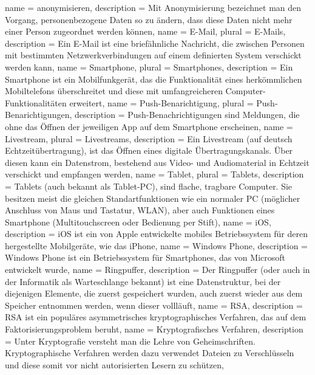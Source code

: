 {
  name = anonymisieren,
  description = {Mit Anonymisierung bezeichnet man den Vorgang, personenbezogene Daten so zu ändern, dass diese Daten nicht mehr einer Person zugeordnet werden können},
}
{
  name = E-Mail,
  plural = E-Mails,
  description = {Ein E-Mail ist eine briefähnliche Nachricht, die zwischen Personen mit bestimmten Netzwerkverbindungen auf einem definierten System verschickt werden kann},
}
{
  name = Smartphone,
  plural = Smartphones,
  description = {Ein Smartphone ist ein Mobilfunkgerät, das die Funktionalität eines herkömmlichen Mobiltelefons überschreitet und diese mit umfangreicheren Computer-Funktionalitäten erweitert},
}
{
  name = Push-Benarichtigung,
  plural = Push-Benarichtigungen,
  description = {Push-Benachrichtigungen sind Meldungen, die ohne das Öffnen der jeweiligen \gls{App} auf dem \gls{Smartphone} erscheinen},
}
{
  name = Livestream,
  plural = Livestreams,
  description = {Ein Livestream (auf deutsch Echtzeitübertragung), ist das Öffnen eines digitale Übertragungskanals. Über diesen kann ein Datenstrom, bestehend aus Video- und Audiomaterial in Echtzeit verschickt und empfangen werden},
}
{
  name = Tablet,
  plural = Tablets,
  description = {Tablets (auch bekannt als Tablet-PC), sind flache, tragbare Computer. Sie besitzen meist die gleichen Standartfunktionen wie ein normaler PC (möglicher Anschluss von Maus und Tastatur, WLAN), aber auch Funktionen eines \gls{Smartphone} (Multitouchscreen oder Bedienung per Stift)},
}
{
  name = iOS,
  description = {iOS ist ein von Apple entwickelte mobiles Betriebssystem für deren hergestellte Mobilgeräte, wie das iPhone},
}
{
  name = Windows Phone,
  description = {Windows Phone ist ein Betriebssystem für Smartphones, das von Microsoft entwickelt wurde},
}
{
  name = Ringpuffer,
  description = {Der Ringpuffer (oder auch in der Informatik als Warteschlange bekannt) ist eine Datenstruktur, bei der diejenigen Elemente, die zuerst gespeichert wurden, auch zuerst wieder aus dem Speicher entnommen werden, wenn dieser vollläuft},
}
{
  name = RSA,
  description = {RSA ist ein populäres asymmetrisches kryptographisches Verfahren, das auf dem Faktorisierungsproblem beruht},
}
{
  name = Kryptografisches Verfahren,
  description = {Unter Kryptografie versteht man die Lehre von Geheimschriften. Kryptographische Verfahren werden dazu verwendet Dateien zu Verschlüsseln und diese somit vor nicht autorisierten Lesern zu schützen},
}
